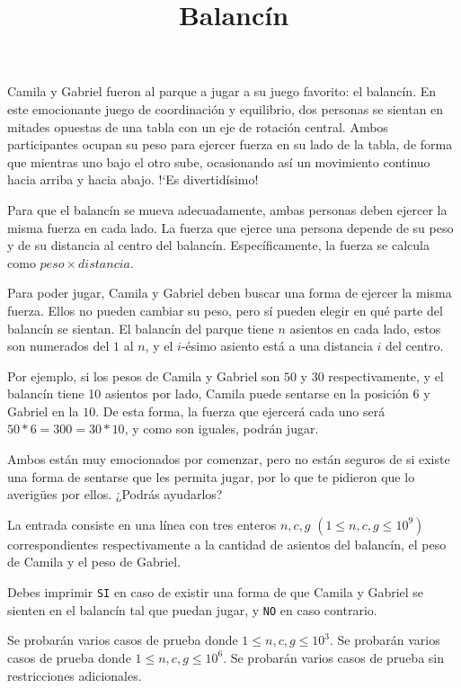 \documentclass{oci}
\title{Balancín}
\begin{document}
\begin{problemDescription}
    Camila y Gabriel fueron al parque a jugar a su juego favorito: el balancín.
    En este emocionante juego de coordinación y equilibrio, dos personas se
    sientan en mitades opuestas de una tabla con un eje de rotación central.
    Ambos participantes ocupan su peso para ejercer fuerza en su lado de la tabla,
    de forma que mientras uno bajo el otro sube, ocasionando así un movimiento
    continuo hacia arriba y hacia abajo.
    !`Es divertidísimo!

    Para que el balancín se mueva adecuadamente, ambas personas deben ejercer
    la misma fuerza en cada lado.
    La fuerza que ejerce una persona depende de su peso y de su distancia
    al centro del balancín.
    Específicamente, la fuerza se calcula como $peso \times distancia$.

    Para poder jugar, Camila y Gabriel deben buscar una forma de ejercer
    la misma fuerza.
    Ellos no pueden cambiar su peso, pero sí pueden elegir en qué parte
    del balancín se sientan.
    El balancín del parque tiene $n$ asientos en cada lado,
    estos son numerados del $1$ al $n$,
    y el $i$-ésimo asiento está a una distancia $i$ del centro.

    Por ejemplo, si los pesos de Camila y Gabriel son $50$ y $30$
    respectivamente, y el balancín tiene 10 asientos por lado,
    Camila puede sentarse en la posición $6$ y Gabriel en la $10$.
    De esta forma, la fuerza que ejercerá cada uno será $50*6=300=30*10$,
    y como son iguales, podrán jugar.

    Ambos están muy emocionados por comenzar, pero no están seguros de si
    existe una forma de sentarse que les permita jugar, por lo que te pidieron
    que lo averigües por ellos. ¿Podrás ayudarlos?

\end{problemDescription}

\begin{inputDescription}
    La entrada consiste en una línea con tres enteros $n, c, g$
    $(1 \leq n, c, g \leq 10^9)$ correspondientes respectivamente
    a la cantidad de asientos del balancín, el peso de Camila
    y el peso de Gabriel.
\end{inputDescription}

\begin{outputDescription}
	Debes imprimir \texttt{SI} en caso de existir una forma de
    que Camila y Gabriel se sienten en el balancín tal que puedan jugar,
    y \texttt{NO} en caso contrario.
\end{outputDescription}

\begin{scoreDescription}
	 Se probarán varios casos de prueba donde $1 \leq n, c, g \leq 10^3$.
	 Se probarán varios casos de prueba donde $1 \leq n, c, g \leq 10^6$.
	 Se probarán varios casos de prueba sin restricciones adicionales.
\end{scoreDescription}

\begin{sampleDescription}
\end{sampleDescription}
\end{document}
